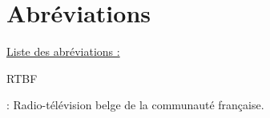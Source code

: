 \section{Abréviations}
\underline  {Liste des abréviations :} 

\hypertarget{RTBF}{RTBF} : Radio-télévision belge de la communauté française.
